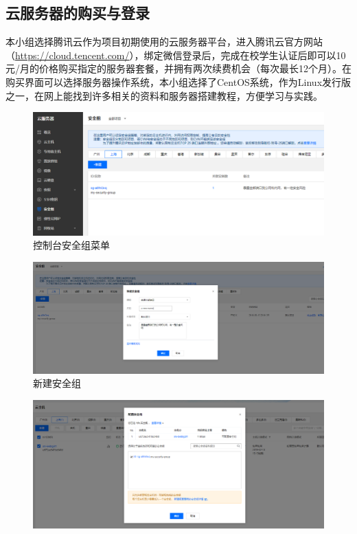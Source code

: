 \documentclass[a4paper,11pt]{ctexart}
\begin{document}
\begin{spacing}{1.5}
\subsection{云服务器的购买与登录}
\par
本小组选择腾讯云作为项目初期使用的云服务器平台，进入腾讯云官方网站（\url{https://cloud.tencent.com/}），绑定微信登录后，完成在校学生认证后即可以10元/月的价格购买指定的服务器套餐，并拥有两次续费机会（每次最长12个月）。在购买界面可以选择服务器操作系统，本小组选择了CentOS系统，作为Linux发行版之一，在网上能找到许多相关的资料和服务器搭建教程，方便学习与实践。
\begin{figure}[h]
	\centering
	\setlength{\abovecaptionskip}{2mm}
	\setlength{\belowcaptionskip}{-2mm}
	\includegraphics[scale=0.35]{安全组1.png}
	\caption{控制台安全组菜单}\label{figure:安全组1}
\end{figure}
\begin{figure}[h]
	\centering
	\setlength{\abovecaptionskip}{2mm}
	\setlength{\belowcaptionskip}{-2mm}
	\includegraphics[scale=0.25]{安全组2.png}
	\caption{新建安全组}\label{figure:安全组2}
\end{figure}
\begin{figure}[h]
	\centering
	\setlength{\abovecaptionskip}{2mm}
	\setlength{\belowcaptionskip}{-2mm}
	\includegraphics[scale=0.25]{安全组3.png}

\end{figure}
\end{spacing}
\end{document}
